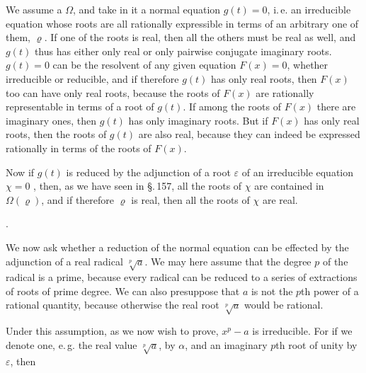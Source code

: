 
\quad We assume a  $\Omega$,
and take in it a normal equation $g(t) = 0$,
i.\,e. an irreducible equation whose roots are all rationally
expressible in terms of an arbitrary one of them, $\varrho$. If one
of the roots is real, then all the others must be real
as well, and $g(t)$ thus has either only real or only pairwise
conjugate imaginary roots. $g(t) = 0$ can be the 
resolvent of any given equation $F(x) = 0$, whether irreducible
or reducible, and if therefore $g(t)$ has only
real roots, then $F(x)$ too can have only real roots, %
because the roots of $F(x)$ are rationally representable
in terms of a root of $g(t)$. If among the roots of $F(x)$ there are
imaginary ones, then $g(t)$ has only imaginary roots. But if $F(x)$
has only real roots, then the roots of $g(t)$ are also real,
because they can indeed be expressed rationally in terms of the
roots of $F(x)$.

\quad Now if $g(t)$ is reduced by the adjunction of a root $\varepsilon$ of an
irreducible equation $\chi = 0$ ,
then, as we have seen in \S.\,157, all the
roots of $\chi$ are contained in $\Omega(\varrho)$, and if therefore
$\varrho$ is real, then all the roots of $\chi$ are real.

. 

\quad We now ask whether a reduction of the normal equation
can be effected by the adjunction of a real radical $\sqrt[p]{a}$.
We may here assume that the degree $p$ of the radical
is a prime, because every radical can be reduced to a series of
extractions of roots of prime degree. We can also
presuppose that $a$ is not the $p$th power of a rational
quantity, because otherwise the real root $\sqrt[p]{a}$ would be rational.

\quad Under this assumption, as we now wish to prove, %
$x^p - a$ is irreducible. For if we denote one, e.\,g. the real
value $\sqrt[p]{a}$, by $\alpha$, and an imaginary $p$th root of unity by $\varepsilon$,
then
